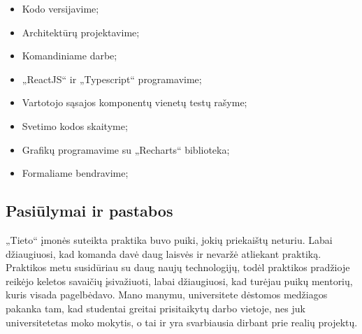 \documentclass{VUMIFPSbakalaurinis}
\begin{document}
\begin{itemize}
    \item Kodo versijavime;
    \item Architektūrų projektavime;
    \item Komandiniame darbe;
    \item „ReactJS“ ir „Typescript“ programavime;
    \item Vartotojo sąsajos komponentų vienetų testų rašyme;
    \item Svetimo kodos skaityme;
    \item Grafikų programavime su „Recharts“ biblioteka;
    \item Formaliame bendravime;
\end{itemize}

\subsection{Pasiūlymai ir pastabos}
„Tieto“ įmonės suteikta praktika buvo puiki, jokių priekaištų neturiu. Labai džiaugiuosi, kad komanda davė daug laisvės ir nevaržė atliekant praktiką. Praktikos metu susidūriau su daug naujų technologijų, todėl praktikos pradžioje reikėjo keletos savaičių įsivažiuoti, labai džiaugiuosi, kad turėjau puikų mentorių, kuris visada pagelbėdavo. Mano manymu, universitete dėstomos medžiagos pakanka tam, kad studentai greitai prisitaikytų darbo vietoje, nes juk universitetetas moko mokytis, o tai ir yra svarbiausia dirbant prie realių projektų.
 
\printbibliography[heading=bibintoc]  %
\end{document}
